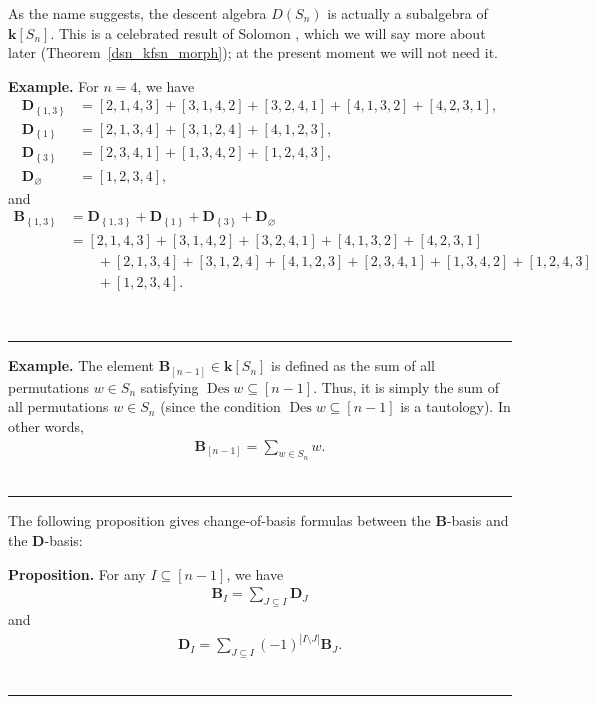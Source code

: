 \documentclass[12pt]{article}
\theoremstyle{definition}%
\newtheorem{prop}[thm]{Proposition}
\theoremstyle{definition}%
\newtheorem{exmp}[thm]{Example}
\theoremstyle{remark}%
\newcommand{\tup}[1]{\left( #1 \right)}
\newcommand{\interval}[1]{\left[ #1 \right]} %
\newcommand{\ponl}[1]{\left[ #1 \right]} %
\newcommand{\set}[1]{\left\{ #1 \right\}}
\newcommand{\card}[1]{\left| #1 \right|} %
\newcommand{\kk}{\mathbf{k}}
\newcommand{\ksn}{\kk\left[S_n\right]}
\newcommand{\dsn}{D\left(S_n\right)}
\newcommand{\BB}{\mathbf{B}}
\newcommand{\DD}{\mathbf{D}}
\newcommand{\Des}{\operatorname{Des}}
\newenvironment{prop}[1][Proposition]{\noindent\textbf{#1.} }{\ \rule{0.5em}{0.5em}}
\newenvironment{exmp}[1][Example]{\noindent\textbf{#1.} }{\ \rule{0.5em}{0.5em}}
\begin{document}
As the name suggests, the descent algebra $\dsn$ is actually a subalgebra of $\ksn$.
This is a celebrated result of Solomon \cite[Theorem 1]{Sol76}, which we will say more about later (Theorem~\ref{dsn_kfsn_morph}); at the present moment we will not need it.

\begin{exmp}
    For $ n=4 $, we have
    \begin{align*}
        \DD_{\set{1,3}} &= \ponl{ 2,1,4,3 } + \ponl{ 3,1,4,2 } + \ponl{ 3,2,4,1 } + \ponl{ 4,1,3,2 } + \ponl{ 4,2,3,1 }, \\
        \DD_{\set{1}} &= \ponl{ 2,1,3,4 } + \ponl{ 3,1,2,4 } + \ponl{ 4,1,2,3 }, \\
        \DD_{\set{3}} &= \ponl{ 2,3,4,1 } + \ponl{ 1,3,4,2 } + \ponl{ 1,2,4,3 }, \\
		\DD_{\varnothing} &= \ponl{ 1,2,3,4 },
    \end{align*}
    and 
    \begin{align*}
        \BB_{\set{1,3}} &= \DD_{\set{1,3}} + \DD_{\set{1}} + \DD_{\set{3}} + \DD_{\varnothing} \\
                        &= \ponl{ 2,1,4,3 } + \ponl{ 3,1,4,2 } + \ponl{ 3,2,4,1 } + \ponl{ 4,1,3,2 } + \ponl{ 4,2,3,1 }\\
                        & \qquad + \ponl{ 2,1,3,4 } + \ponl{ 3,1,2,4 } + \ponl{ 4,1,2,3 }
						+ \ponl{ 2,3,4,1 } + \ponl{ 1,3,4,2 } + \ponl{ 1,2,4,3 } \\
						& \qquad + \ponl{ 1,2,3,4 }.
    \end{align*}

\end{exmp}

\begin{exmp}
\label{exam.Bn-1}
    The element $\BB_{\interval{n-1}} \in \ksn$ is
	defined as the sum of all permutations $w\in S_n$ satisfying
	$\Des w \subseteq \interval{n-1}$.
	Thus, it is simply the
	sum of all permutations $w\in S_n$ (since the condition
	$\Des w \subseteq \interval{n-1}$ is a tautology).
	In other words,
	\begin{align}
	\BB_{\interval{n-1}} = \sum_{w \in S_n} w.
	\label{eq.exam.Bn-1.1}
	\end{align}
\end{exmp}

The following proposition gives change-of-basis formulas between the $\BB$-basis and the $\DD$-basis:

\begin{prop}
\label{prop.BD-cob}
For any $I \subseteq \interval{n-1}$, we have
    \begin{align}
    \BB_{I} = \sum_{J \subseteq I} \DD_J
    \label{eq.BD-cob.B}
    \end{align}
and
    \begin{align}
    \DD_I = \sum_{J \subseteq I} \tup{-1}^{\card{I\setminus J}} \BB_J.
    \label{eq.BD-cob.D}
    \end{align}
\end{prop}
\end{document}
